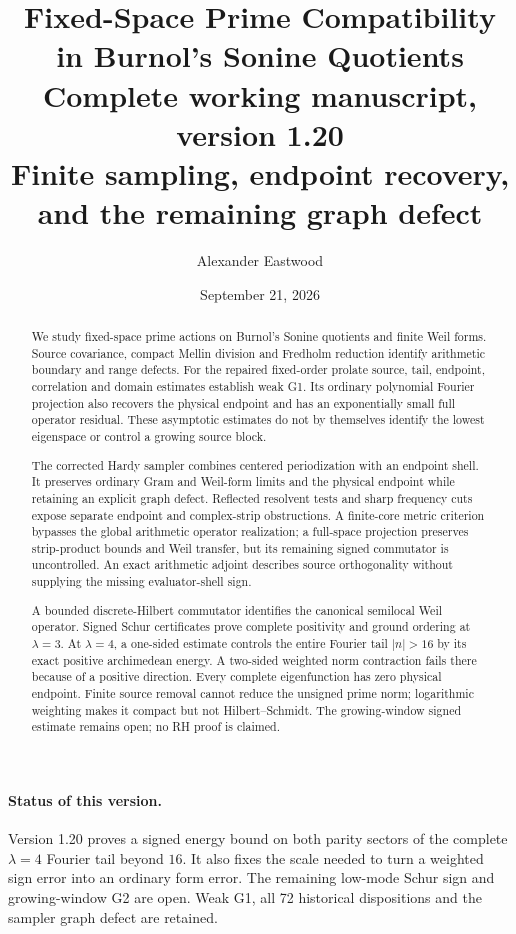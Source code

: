 \documentclass[11pt]{article}
\title{\textbf{Fixed-Space Prime Compatibility in Burnol's Sonine Quotients}\\[5pt]
\large Complete working manuscript, version 1.20\\
\normalsize Finite sampling, endpoint recovery, and the remaining graph defect}
\author{Alexander Eastwood}
\date{September 21, 2026}
\theoremstyle{remark}
\begin{document}
\maketitle
\begin{abstract}
We study fixed-space prime actions on Burnol's Sonine quotients and
finite Weil forms. Source covariance, compact Mellin division and
Fredholm reduction identify arithmetic boundary and range defects.
For the repaired fixed-order prolate source, tail, endpoint, correlation
and domain estimates establish weak G1. Its ordinary polynomial
Fourier projection also recovers the physical endpoint and has an
exponentially small full operator residual. These asymptotic estimates do not by themselves identify
the lowest eigenspace or control a growing source block.

The corrected Hardy sampler combines centered periodization with an
endpoint shell. It preserves ordinary Gram and Weil-form limits and
the physical endpoint while retaining an explicit graph defect.
Reflected resolvent tests and sharp frequency cuts expose separate
endpoint and complex-strip obstructions. A finite-core metric criterion
bypasses the global arithmetic operator realization; a full-space
projection preserves strip-product bounds and Weil transfer, but its
remaining signed commutator is uncontrolled. An exact arithmetic
adjoint describes source orthogonality without supplying the missing
evaluator-shell sign.

A bounded discrete-Hilbert commutator identifies the canonical
semilocal Weil operator. Signed Schur certificates prove complete
positivity and ground ordering at $\lambda=3$. At $\lambda=4$,
a one-sided estimate controls the entire Fourier tail $|n|>16$
by its exact positive archimedean energy. A two-sided weighted norm
contraction fails there because of a positive direction. Every complete
eigenfunction has zero physical endpoint. Finite source removal cannot
reduce the unsigned prime norm; logarithmic weighting makes it compact
but not Hilbert--Schmidt. The growing-window signed estimate remains
open; no RH proof is claimed.
\end{abstract}

\paragraph{Status of this version.}
Version 1.20 proves a signed energy bound on both parity sectors
of the complete $\lambda=4$ Fourier tail beyond $16$. It also fixes
the scale needed to turn a weighted sign error into an ordinary form
error. The remaining low-mode Schur sign and growing-window G2 are open.
Weak G1, all 72 historical dispositions and the sampler graph defect
are retained.
\end{document}
